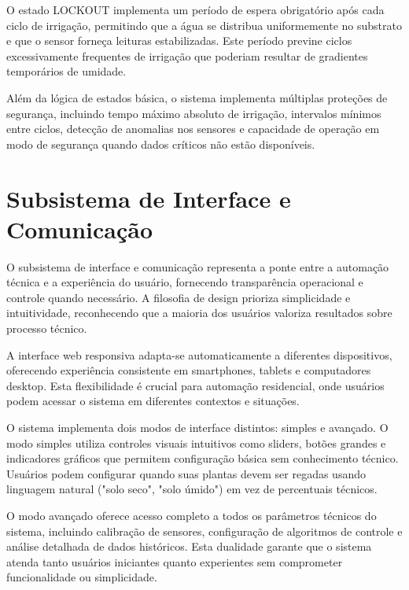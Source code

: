\documentclass[twoside,english,brazilian]{UNISINOSmonografia}
\begin{document}
O estado LOCKOUT implementa um período de espera obrigatório após cada ciclo de irrigação, permitindo que a água se distribua uniformemente no substrato e que o sensor forneça leituras estabilizadas. Este período previne ciclos excessivamente frequentes de irrigação que poderiam resultar de gradientes temporários de umidade.

Além da lógica de estados básica, o sistema implementa múltiplas proteções de segurança, incluindo tempo máximo absoluto de irrigação, intervalos mínimos entre ciclos, detecção de anomalias nos sensores e capacidade de operação em modo de segurança quando dados críticos não estão disponíveis.


\section{Subsistema de Interface e Comunicação}

O subsistema de interface e comunicação representa a ponte entre a automação técnica e a experiência do usuário, fornecendo transparência operacional e controle quando necessário. A filosofia de design prioriza simplicidade e intuitividade, reconhecendo que a maioria dos usuários valoriza resultados sobre processo técnico.

A interface web responsiva adapta-se automaticamente a diferentes dispositivos, oferecendo experiência consistente em smartphones, tablets e computadores desktop. Esta flexibilidade é crucial para automação residencial, onde usuários podem acessar o sistema em diferentes contextos e situações.

O sistema implementa dois modos de interface distintos: simples e avançado. O modo simples utiliza controles visuais intuitivos como sliders, botões grandes e indicadores gráficos que permitem configuração básica sem conhecimento técnico. Usuários podem configurar quando suas plantas devem ser regadas usando linguagem natural ("solo seco", "solo úmido") em vez de percentuais técnicos.

O modo avançado oferece acesso completo a todos os parâmetros técnicos do sistema, incluindo calibração de sensores, configuração de algoritmos de controle e análise detalhada de dados históricos. Esta dualidade garante que o sistema atenda tanto usuários iniciantes quanto experientes sem comprometer funcionalidade ou simplicidade.
\end{document}
